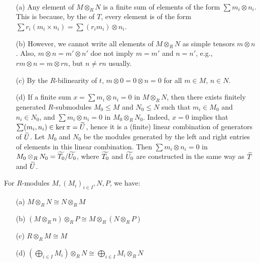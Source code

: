 \documentclass[11pt]{book}
\theoremstyle{definition}   \newtheorem{defn}[counter]{Definition} %
\newcommand{\vs}{\vspace{8pt}}
\numberwithin{counter}{chapter}
\begin{document}
\vs

\begin{remark}\ 
\begin{enumerate}
\item[(a)] Any element of $M \otimes_R N$ is a finite sum of elements of the form $\sum m_i \otimes n_i$. This is because, by the of $T$, every element is of the form $\sum r_i (m_i \times n_i) = \sum (r_i m_i) \otimes n_i$. 

\item[(b)] However, we cannot write all elements of $M\otimes_R N$ as simple tensors $m \otimes n$. Also, $m \otimes n = m' \otimes n'$ doe not imply $m = m'$ and $n = n'$, e.g., $rm \otimes n = m \otimes rn$, but $n \ne rn$ usually. 

\item[(c)]By the $R$-bilinearity of $t$, $m \otimes 0 = 0 \otimes n = 0$ for all $m \in M$, $n \in N$.

\item[(d)] If a finite sum $x = \sum m_i \otimes n_i = 0$ in $M \otimes_R N$, then there exists finitely generated $R$-submodules $M_0 \leq M$ and $N_0 \leq N$ such that $m_i \in M_0$ and $n_i \in N_0$, and $\sum m_i \otimes n_i = 0$ in $M_0 \otimes_R N_0$. Indeed, $x = 0$ implies that $\sum (m_i,n_i) \in \ker \pi = \widetilde{U}$, hence it is a (finite) linear combination of generators of $\widetilde{U}$. Let $M_0$ and $N_0$ be the modules generated by the left and right entries of elements in this linear combination. Then $\sum m_i \otimes n_i = 0$ in $M_0 \otimes_R N_0 = \widetilde{T_0}/\widetilde{U_0}$, where $\widetilde{T_0}$ and $\widetilde{U_0}$ are constructed in the same way as $\widetilde{T}$ and $\widetilde{U}$. 
\end{enumerate}
\end{remark}

\vs

\begin{lemma}
For $R$-modules $M, (M_i)_{i \in I}, N, P$, we have:
\begin{enumerate}
\item[(a)] $M \otimes_R N \cong N \otimes_R M$
\item[(b)] $(M \otimes_R n) \otimes_R P \cong M \otimes_R (N \otimes_R P)$
\item[(c)] $R \otimes_R M \cong M$
\item[(d)] $\left(\bigoplus_{i \in I} M_i\right) \otimes_R N \cong \bigoplus_{i \in I} M_i \otimes_R N$
\end{enumerate}
\end{lemma}
\end{document}
